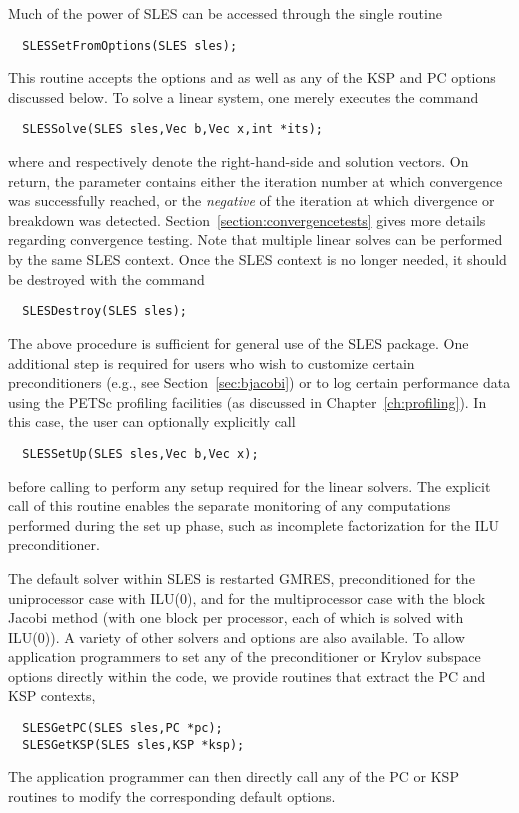 Much of the power of SLES can be accessed through the single routine
\begin{verbatim}
  SLESSetFromOptions(SLES sles);
\end{verbatim}
This 
routine accepts the options  and  as well as 
any of the KSP and PC options discussed below. 
To solve a linear system, one merely executes the command 
\begin{verbatim}
  SLESSolve(SLES sles,Vec b,Vec x,int *its);
\end{verbatim}
where  and  respectively denote the right-hand-side and
solution vectors.  On return, the parameter  contains
either the iteration number at which convergence was successfully
reached, or the {\em negative} of the iteration at which divergence or
breakdown was detected.  Section~\ref{section:convergencetests} gives
more details regarding convergence testing.
Note that multiple linear solves can be performed by the same SLES context.
Once the SLES context is no longer needed, it should be destroyed with the 
command 
\begin{verbatim}
  SLESDestroy(SLES sles);
\end{verbatim}

The above procedure is sufficient for general use of the SLES package.
One additional step is required for users who wish to customize certain 
preconditioners (e.g., see Section~\ref{sec:bjacobi}) or to log certain 
performance data using the PETSc profiling facilities (as discussed in 
Chapter~\ref{ch:profiling}).
In this case, the user can optionally explicitly call 
\begin{verbatim}
  SLESSetUp(SLES sles,Vec b,Vec x);
\end{verbatim}
before calling  to perform any setup required for 
the linear solvers.  The explicit call of this routine enables the
separate monitoring of any computations performed during the set up
phase, such as incomplete factorization for the ILU preconditioner.

The default solver within SLES is restarted GMRES, preconditioned for
the uniprocessor case with ILU(0), and for the multiprocessor case
with the block Jacobi method (with one block per processor, each of
which is solved with ILU(0)). A variety of other solvers
and options are also available.
To allow application programmers to set any of the preconditioner or 
Krylov subspace options directly within the code, we provide routines
that extract the PC and KSP contexts, 
\begin{verbatim}
  SLESGetPC(SLES sles,PC *pc);
  SLESGetKSP(SLES sles,KSP *ksp);
\end{verbatim}
The application programmer can then directly call any of the PC or KSP 
routines to modify the corresponding default options.   

